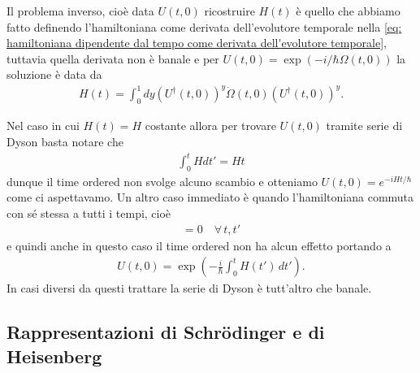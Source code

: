 Il problema inverso, cioè data $ U(t,0) $ ricostruire $ H(t) $ è quello che abbiamo fatto definendo l'hamiltoniana come derivata dell'evolutore temporale 
nella \eqref{eq: hamiltoniana dipendente dal tempo come derivata dell'evolutore temporale}, tuttavia quella derivata non è banale e per 
$ U(t,0) = \exp\left( -i/\hbar \Omega(t,0) \right) $ la soluzione è data da 
\begin{align*}
  H(t) = \int_0^1 dy \left( U^\dag(t,0) \right)^y \dot{\Omega}(t,0) \left( U^\dag(t,0) \right)^y.
\end{align*}

\begin{example}
  Nel caso in cui $ H(t) = H $ costante allora per trovare $ U(t,0) $ tramite serie di Dyson basta notare che
  \begin{align*}
    \int_0^t H dt' = Ht
  \end{align*}
  dunque il time ordered non svolge alcuno scambio e otteniamo $ U(t,0) = e^{-i H t /\hbar} $ come ci aspettavamo. Un altro caso immediato è quando 
  l'hamiltoniana commuta con sé stessa a tutti i tempi, cioè
  \begin{align*}
    [H(t), H(t')] = 0 \quad \forall\, t,t'
  \end{align*}
  e quindi anche in questo caso il time ordered non ha alcun effetto portando a 
  \begin{align*}
    U(t,0) = \exp\left( -\frac{i}\hbar \int_0^t H(t') \, dt' \right).
  \end{align*}
  In casi diversi da questi trattare la serie di Dyson è tutt'altro che banale.
\end{example}

\subsection{Rappresentazioni di Schrödinger e di Heisenberg}

